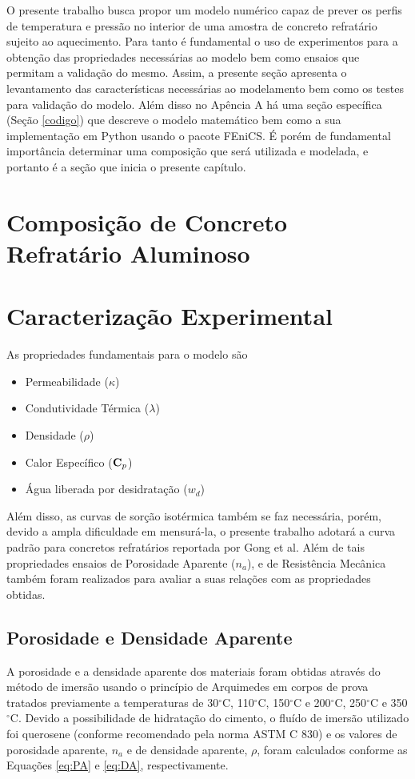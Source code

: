 O presente trabalho busca propor um modelo numérico capaz de prever os perfis de
temperatura e pressão no interior de uma amostra de concreto refratário sujeito
ao aquecimento. Para tanto é fundamental o uso de experimentos para a obtenção
das propriedades necessárias ao modelo bem como ensaios que permitam a validação
do mesmo. Assim, a presente seção apresenta o levantamento das características
necessárias ao modelamento bem como os testes para validação do modelo. Além
disso no Apência A há uma seção específica (Seção \ref{codigo}) que descreve o modelo
matemático bem como a sua implementação em Python usando o pacote FEniCS. É
porém de fundamental importância determinar uma composição que será utilizada
e modelada, e portanto é a seção que inicia o presente capítulo.

\section{Composição de Concreto Refratário Aluminoso}

        
\section{Caracterização Experimental}\label{mat:exp}
As propriedades fundamentais para o modelo são

\begin{itemize}
\item Permeabilidade ($\kappa$)
\item Condutividade Térmica ($\lambda$)
\item Densidade ($\rho$)
\item Calor Específico ($\bm{\mathrm{C}}_p$)
\item Água liberada por desidratação ($w_d$)
\end{itemize}

Além disso, as curvas de sorção isotérmica também se faz necessária, porém,
devido a ampla dificuldade em mensurá-la, o presente trabalho adotará a curva
padrão para concretos refratários reportada por Gong et al\cite{Gong1995a}. Além
de tais propriedades ensaios de Porosidade Aparente ($n_a$), e de Resistência
Mecânica também foram realizados para avaliar a suas relações com as
propriedades obtidas.

    \subsection{Porosidade e Densidade Aparente}\label{mat:porosidade}
    A porosidade e a densidade aparente dos materiais foram obtidas através do
    método de imersão usando o princípio de Arquimedes em corpos de prova
    tratados previamente a temperaturas de 30$^\circ$C, 110$^\circ$C,
    150$^\circ$C e 200$^\circ$C, 250$^\circ$C e 350$^\circ$C. Devido a
    possibilidade de hidratação do cimento, o fluído de imersão utilizado foi
    querosene (conforme recomendado pela norma ASTM C 830) e os valores de
    porosidade aparente, $n_a$ e de densidade aparente, $\rho$, foram calculados
    conforme as Equações \ref{eq:PA} e \ref{eq:DA}, respectivamente.


